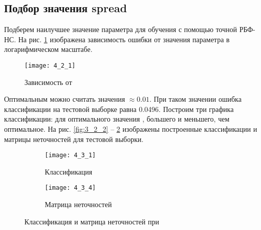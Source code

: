 \subsection{Подбор значения spread}


Подберем наилучшее значение параметра  для обучения с помощью точной РБФ-НС. На рис. \ref{fig:4_2_1} изображена зависимость ошибки  от значения параметра  в логарифмическом масштабе. 
\vspace{-1cm}
\begin{figure}[H]
\begin{center}
	\texttt{[image: 4\_2\_1]}
	\caption{Зависимость  от }
	\label{fig:4_2_1}
\end{center}
\end{figure}
\vspace{-0.5cm}

Оптимальным можно считать значения  $\approx 0.01$. При таком значении ошибка классификации на тестовой выборке равна 0.0496. Построим три графика классификации: для оптимального значения , большего и меньшего, чем оптимальное. На рис. \ref{fig:3_2_2} -- \ref{fig:3_2_4} изображены построенные классификации и матрицы неточностей для тестовой выборки. 
\vspace{-1cm}
\begin{figure}[H]
\begin{center}
	\begin{subfigure}{0.49\textwidth}
		\texttt{[image: 4\_3\_1]}
		\caption{Классификация}
	\end{subfigure}
	\begin{subfigure}{0.47\textwidth}
		\texttt{[image: 4\_3\_4]}
		\caption{Матрица неточностей}
	\end{subfigure}
	\caption{Классификация и матрица неточностей при }
	\label{fig:3_2_4}
\end{center}
\end{figure}

